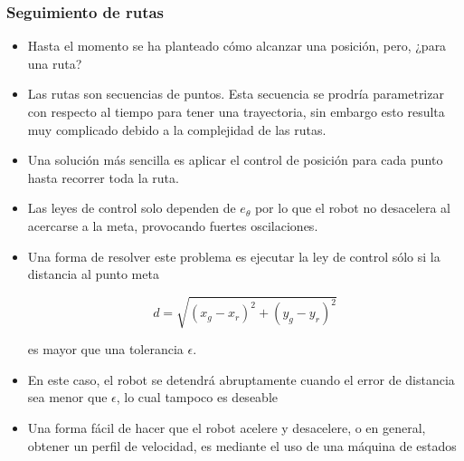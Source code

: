 \begin{frame}\frametitle{Seguimiento de rutas}
  \begin{itemize}
  \item Hasta el momento se ha planteado cómo alcanzar una posición, pero, ¿para una ruta?
  \item Las rutas son secuencias de puntos. Esta secuencia se prodría parametrizar con respecto al tiempo para tener una trayectoria, sin embargo esto resulta muy complicado debido a la complejidad de las rutas.
  \item Una solución más sencilla es aplicar el control de posición para cada punto hasta recorrer toda la ruta.
  \item Las leyes de control solo dependen de $e_\theta$ por lo que el robot no desacelera al acercarse a la meta, provocando fuertes oscilaciones.
  \item Una forma de resolver este problema es ejecutar la ley de control sólo si la distancia al punto meta 

    \[d=\sqrt{(x_g - x_r)^2 + (y_g - y_r)^2}\] 
    
    es mayor que una tolerancia $\epsilon$.
  \item En este caso, el robot se detendrá abruptamente cuando el error de distancia sea menor que $\epsilon$, lo cual tampoco es deseable
  \item Una forma fácil de hacer que el robot acelere y desacelere, o en general, obtener un perfil de velocidad, es mediante el uso de una máquina de estados
    
  \end{itemize}
\end{frame}

